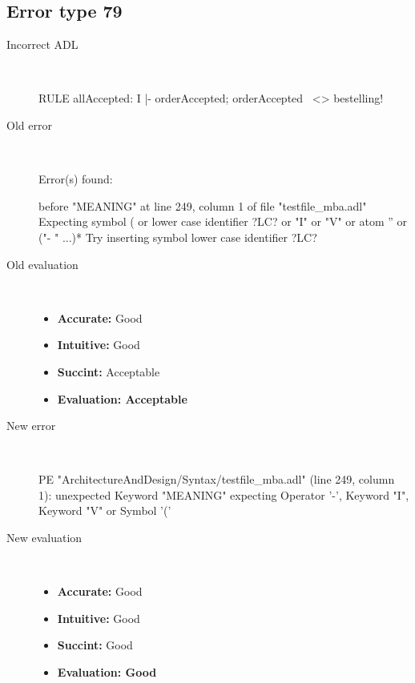 \subsection{Error type 79}
  \begin{description}
  \item[Incorrect ADL]~\\
\begin{adl}
RULE allAccepted: I |- orderAccepted; orderAccepted~ <> bestelling!\end{adl}
  \item[Old error]~\\
\begin{haskell}
Error(s) found:

before "MEANING" at line 249, column 1 of file "testfile_mba.adl"
Expecting symbol ( or lower case identifier ?LC? or "I" or "V" or atom '' or ("-
" ...)*
Try inserting symbol lower case identifier ?LC?\end{haskell}
  \item[Old evaluation]~\\
    \begin{itemize}
    \item \textbf{Accurate:} Good
    \item \textbf{Intuitive:} Good
    \item \textbf{Succint:} Acceptable
    \item \textbf{Evaluation: Acceptable}
    \end{itemize}
  \item[New error]~\\
\begin{haskell}
PE "ArchitectureAndDesign/Syntax/testfile_mba.adl" (line 249, column 1):
unexpected Keyword "MEANING"
expecting Operator '-', Keyword "I", Keyword "V" or Symbol '('
\end{haskell}
  \item[New evaluation]~\\
    \begin{itemize}
    \item \textbf{Accurate:} Good
    \item \textbf{Intuitive:} Good
    \item \textbf{Succint:} Good
    \item \textbf{Evaluation: Good
}
    \end{itemize}
  \end{description}

\hrulefill

